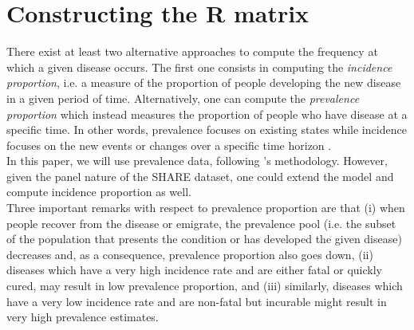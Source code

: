 




\section{Constructing the R matrix}

There exist at least two alternative approaches to compute the frequency at which a given disease occurs. The first one consists in computing the \textit{incidence proportion}, i.e. a measure of the proportion of people developing the new disease in a given period of time. Alternatively, one can compute the \textit{prevalence proportion} which instead measures the proportion of people who have disease at a specific time. In other words, prevalence focuses on existing states while incidence focuses on the new events or changes over a specific time horizon \citep{Rothman2008ModernEpidemiology}.\\


In this paper, we will use prevalence data, following \cite{Caswell2018}'s methodology. However, given the panel nature of the SHARE dataset, one could extend the model and compute incidence proportion as well. \\

Three important remarks with respect to prevalence proportion are that (i) 
when people recover from the disease or emigrate, the prevalence pool (i.e. the subset of the population that presents the condition or has developed the given disease) decreases and, as a consequence, prevalence proportion also goes down, (ii) diseases which have a very high incidence rate and are either fatal or quickly cured, may result in low prevalence proportion, and (iii) similarly, diseases which have a very low incidence rate and are non-fatal but incurable might result in very high prevalence estimates. \\


